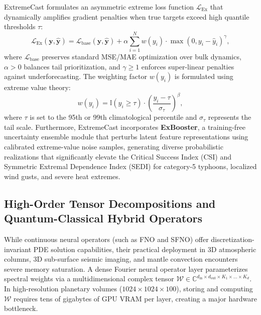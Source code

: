 ExtremeCast formulates an asymmetric extreme loss function $\mathcal{L}_{\text{Ex}}$ that dynamically amplifies gradient penalties when true targets exceed high quantile thresholds $\tau$:
\begin{equation}
    \mathcal{L}_{\text{Ex}}(\mathbf{y}, \hat{\mathbf{y}}) = \mathcal{L}_{\text{base}}(\mathbf{y}, \hat{\mathbf{y}}) + \alpha \sum_{i=1}^N w(y_i) \cdot \max(0, y_i - \hat{y}_i)^\gamma,
    \label{eq:exloss}
\end{equation}
where $\mathcal{L}_{\text{base}}$ preserves standard MSE/MAE optimization over bulk dynamics, $\alpha > 0$ balances tail prioritization, and $\gamma \ge 1$ enforces super-linear penalties against underforecasting. The weighting factor $w(y_i)$ is formulated using extreme value theory:
\begin{equation}
    w(y_i) = \mathbb{I}(y_i \ge \tau) \cdot \left( \frac{y_i - \tau}{\sigma_\tau} \right)^\beta,
\end{equation}
where $\tau$ is set to the 95th or 99th climatological percentile and $\sigma_\tau$ represents the tail scale. Furthermore, ExtremeCast incorporates \textbf{ExBooster}, a training-free uncertainty ensemble module that perturbs latent feature representations using calibrated extreme-value noise samples, generating diverse probabilistic realizations that significantly elevate the Critical Success Index (CSI) and Symmetric Extremal Dependence Index (SEDI) for category-5 typhoons, localized wind gusts, and severe heat extremes.

\subsection{High-Order Tensor Decompositions and Quantum-Classical Hybrid Operators}
\label{sec:tensor_quantum_operators}
While continuous neural operators (such as FNO and SFNO) offer discretization-invariant PDE solution capabilities, their practical deployment in 3D atmospheric columns, 3D sub-surface seismic imaging, and mantle convection encounters severe memory saturation. A dense Fourier neural operator layer parameterizes spectral weights via a multidimensional complex tensor $\mathcal{W} \in \mathbb{C}^{d_{\text{in}} \times d_{\text{out}} \times K_1 \times \dots \times K_d}$. In high-resolution planetary volumes ($1024 \times 1024 \times 100$), storing and computing $\mathcal{W}$ requires tens of gigabytes of GPU VRAM per layer, creating a major hardware bottleneck.


